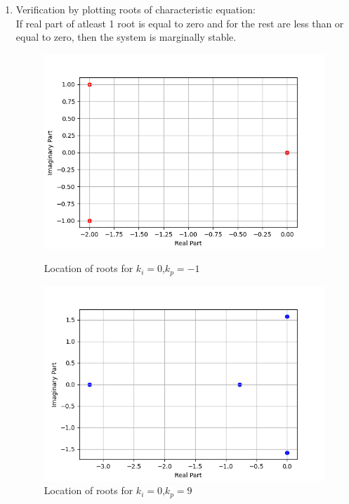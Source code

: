 \documentclass[journal,12pt,onecolumn]{IEEEtran}
\theoremstyle{remark}
\begin{document}
    \begin{enumerate}
        \item Verification by plotting roots of characteristic equation:\\
        If real part of atleast 1 root is equal to zero and for the rest are less than or equal to zero, then the system is marginally stable.
\begin{figure}    
    \centering
\graphicspath{ {2021/EC/48/figs} }
\includegraphics[width=\columnwidth]{graph_1}
\label{figure:ee25-gate4-graph1}
\caption{Location of roots for $k_i=0$,$k_p=-1$}
\end{figure}

\begin{figure}    
    \centering
\graphicspath{ {2021/EC/48/figs} }
\includegraphics[width=\columnwidth]{graph_2}
\caption{Location of roots for $k_i=0$,$k_p=9$}
\label{figure:ee25-gate4-graph2}
\end{figure}


\end{enumerate}
\end{document}
